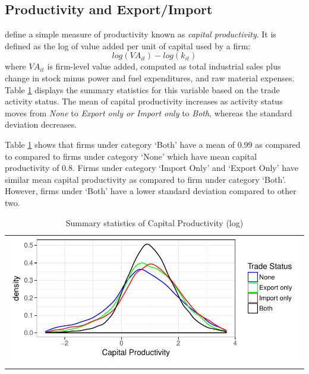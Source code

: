 \documentclass[12pt]{article}
\begin{document}
\subsection{Productivity and Export/Import}

\textcite{gupta2018exporting} define a simple measure of productivity known
as \textit{capital productivity}. It is defined as the log of value added per
unit of capital used by a firm:
\begin{equation}
 log(VA_{it}) - log(k_{it})
\end{equation}
where $VA_{it}$ is firm-level value added, computed as total industrial sales plus
change in stock minus power and fuel expenditures, and raw material
expenses. 
 Table \ref{tab:capprod} displays the summary statistics for this variable
based on the trade activity status. The mean of capital
productivity increases as activity status moves from \textit{None} to
\textit{Export only or Import only} to \textit{Both}, whereas the
standard deviation decreases.  

Table \ref{tab:capprod} shows that firms under category `Both' have
  a mean of 0.99 as compared to compared to firms under category
  `None'  which have mean capital productivity of 0.8. Firms under
  category `Import Only' and `Export Only' have similar mean capital
  productivity as compared to firm under category `Both'. However,
  firms under `Both' have a lower standard deviation compared to other
  two.
\begin{center}
\begin{table}[H]
\caption{Summary statistics of Capital Productivity (log)}
\label{tab:capprod}
\begin{tabular}{c}
 \includegraphics{./PICS/denscapprod.pdf}   \\ 
   \\  
\end{tabular}
\end{table}
\end{center}
\end{document}
